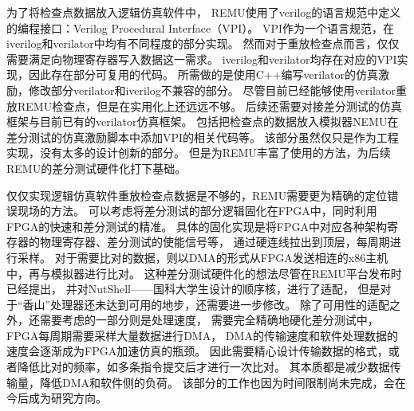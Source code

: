 为了将检查点数据放入逻辑仿真软件中，
REMU使用了verilog的语言规范中定义的编程接口：Verilog Procedural Interface（VPI）。
VPI作为一个语言规范，在iverilog和verilator中均有不同程度的部分实现。
然而对于重放检查点而言，仅仅需要满足向物理寄存器写入数据这一需求。
iverilog和verilator均存在对应的VPI实现，因此存在部分可复用的代码。
所需做的是使用C++编写verilator的仿真激励，修改部分verilator和iverilog不兼容的部分。
尽管目前已经能够使用verilator重放REMU检查点，但是在实用化上还远远不够。
后续还需要对接差分测试的仿真框架与目前已有的verilator仿真框架。
包括把检查点的数据放入模拟器NEMU在差分测试的仿真激励脚本中添加VPI的相关代码等。
该部分虽然仅只是作为工程实现，没有太多的设计创新的部分。
但是为REMU丰富了使用的方法，为后续REMU的差分测试硬件化打下基础。

仅仅实现逻辑仿真软件重放检查点数据是不够的，REMU需要更为精确的定位错误现场的方法。
可以考虑将差分测试的部分逻辑固化在FPGA中，同时利用FPGA的快速和差分测试的精准。
具体的固化实现是将FPGA中对应各种架构寄存器的物理寄存器、差分测试的使能信号等，
通过硬连线拉出到顶层，每周期进行采样。
对于需要比对的数据，则以DMA的形式从FPGA发送相连的x86主机中，再与模拟器进行比对。
这种差分测试硬件化的想法尽管在REMU平台发布时已经提出，
并对NutShell——国科大学生设计的顺序核，进行了适配，
但是对于“香山”处理器还未达到可用的地步，还需要进一步修改。
除了可用性的适配之外，还需要考虑的一部分则是处理速度，
需要完全精确地硬化差分测试中，FPGA每周期需要采样大量数据进行DMA，
DMA的传输速度和软件处理数据的速度会逐渐成为FPGA加速仿真的瓶颈。
因此需要精心设计传输数据的格式，或者降低比对的频率，如多条指令提交后才进行一次比对。
其本质都是减少数据传输量，降低DMA和软件侧的负荷。
该部分的工作也因为时间限制尚未完成，会在今后成为研究方向。